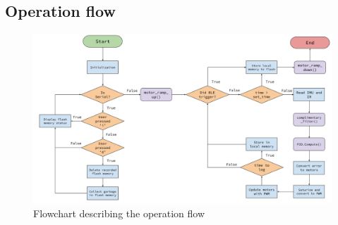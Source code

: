 \subsection{Operation flow}

\begin{figure}[H]
    \begin{center}
    \includegraphics[scale=0.32]{pictures/flowchart}
    \end{center}
    \caption{Flowchart describing the operation flow}
    \label{fig:flowchart}
\end{figure}